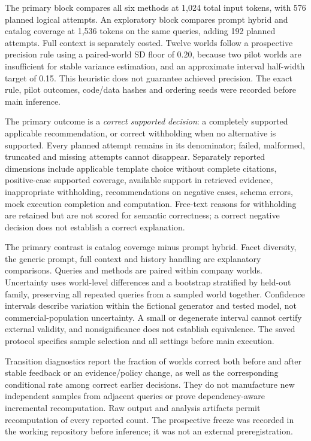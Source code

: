 The primary block compares all six methods at 1,024 total input tokens, with 576 planned logical attempts. An exploratory block compares prompt hybrid and catalog coverage at 1,536 tokens on the same queries, adding 192 planned attempts. Full context is separately costed. Twelve worlds follow a prospective precision rule using a paired-world SD floor of 0.20, because two pilot worlds are insufficient for stable variance estimation, and an approximate interval half-width target of 0.15. This heuristic does not guarantee achieved precision. The exact rule, pilot outcomes, code/data hashes and ordering seeds were recorded before main inference.

The primary outcome is a \emph{correct supported decision}: a completely supported applicable recommendation, or correct withholding when no alternative is supported. Every planned attempt remains in its denominator; failed, malformed, truncated and missing attempts cannot disappear. Separately reported dimensions include applicable template choice without complete citations, positive-case supported coverage, available support in retrieved evidence, inappropriate withholding, recommendations on negative cases, schema errors, mock execution completion and computation. Free-text reasons for withholding are retained but are not scored for semantic correctness; a correct negative decision does not establish a correct explanation.

The primary contrast is catalog coverage minus prompt hybrid. Facet diversity, the generic prompt, full context and history handling are explanatory comparisons. Queries and methods are paired within company worlds. Uncertainty uses world-level differences and a bootstrap stratified by held-out family, preserving all repeated queries from a sampled world together. Confidence intervals describe variation within the fictional generator and tested model, not commercial-population uncertainty. A small or degenerate interval cannot certify external validity, and nonsignificance does not establish equivalence. The saved protocol specifies sample selection and all settings before main execution.

Transition diagnostics report the fraction of worlds correct both before and after stable feedback or an evidence/policy change, as well as the corresponding conditional rate among correct earlier decisions. They do not manufacture new independent samples from adjacent queries or prove dependency-aware incremental recomputation. Raw output and analysis artifacts permit recomputation of every reported count. The prospective freeze was recorded in the working repository before inference; it was not an external preregistration.
